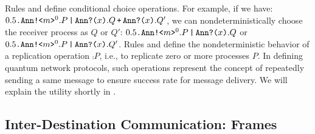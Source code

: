 Rules  and  define conditional choice operations. For example, if we have:
$0.5\texttt{.}\texttt{Ann}\texttt{!<}m\texttt{>}^0.P\,\texttt{|}\,\texttt{Ann}\texttt{?(}x\texttt{)}.Q\,\texttt{+}\,\texttt{Ann}\texttt{?(}x\texttt{)}.Q'$, 
we can nondeterministically choose the receiver process as $Q$ or $Q'$:
$0.5\texttt{.}\texttt{Ann}\texttt{!<}m\texttt{>}^0.P\,\texttt{|}\,\texttt{Ann}\texttt{?(}x\texttt{)}.Q$
or
$0.5\texttt{.}\texttt{Ann}\texttt{!<}m\texttt{>}^0.P\,\texttt{|}\,\texttt{Ann}\texttt{?(}x\texttt{)}.Q'$.
Rules  and  define the nondeterministic behavior of a replication operation $\comp{P}$,
i.e., to replicate zero or more processes $P$. In defining quantum network protocols, 
such operations represent the concept of repeatedly sending a same message to ensure success rate for message delivery.
We will explain the utility shortly in .

\subsection{Inter-Destination Communication: Frames} \label{sec:qamsyntax1}

